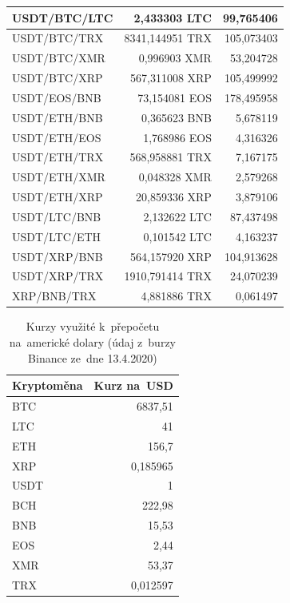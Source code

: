 \documentclass[thesis=B,czech]{FITthesis}[2019/03/21]
\begin{document}
\begin{table}
\begin{tabular}{|| l | r | r ||}
 \hline USDT/BTC/LTC & 2,433303 LTC & 99,765406\\ 
 \hline USDT/BTC/TRX & 8341,144951 TRX & 105,073403\\ 
 \hline USDT/BTC/XMR & 0,996903 XMR & 53,204728\\ 
 \hline USDT/BTC/XRP & 567,311008 XRP & 105,499992\\ 
 \hline USDT/EOS/BNB & 73,154081 EOS & 178,495958\\ 
 \hline USDT/ETH/BNB & 0,365623 BNB & 5,678119\\ 
 \hline USDT/ETH/EOS & 1,768986 EOS & 4,316326\\ 
 \hline USDT/ETH/TRX & 568,958881 TRX & 7,167175\\ 
 \hline USDT/ETH/XMR & 0,048328 XMR & 2,579268\\ 
 \hline USDT/ETH/XRP & 20,859336 XRP & 3,879106\\ 
 \hline USDT/LTC/BNB & 2,132622 LTC & 87,437498\\ 
 \hline USDT/LTC/ETH & 0,101542 LTC & 4,163237\\ 
 \hline USDT/XRP/BNB & 564,157920 XRP & 104,913628\\ 
 \hline USDT/XRP/TRX & 1910,791414 TRX & 24,070239\\ 
 \hline XRP/BNB/TRX & 4,881886 TRX & 0,061497\\ 
 \hline
\end{tabular}
\end{table}

\begin{table}\centering
\caption{Kurzy využité k~přepočetu na~americké dolary (údaj z~burzy Binance ze~dne 13.4.2020)}
\label{table_rates}
\begin{tabular}{|| l | r ||}
\hline Kryptoměna & Kurz na~USD \\ 
\hline\hline BTC & 6837,51 \\ 
\hline LTC & 41 \\ 
\hline ETH & 156,7 \\ 
\hline XRP & 0,185965 \\ 
\hline USDT & 1 \\ 
\hline BCH & 222,98 \\ 
\hline BNB & 15,53 \\ 
\hline EOS & 2,44 \\ 
\hline XMR & 53,37 \\ 
\hline TRX & 0,012597 \\ 
\hline
\end{tabular}
\end{table}
\end{document}
